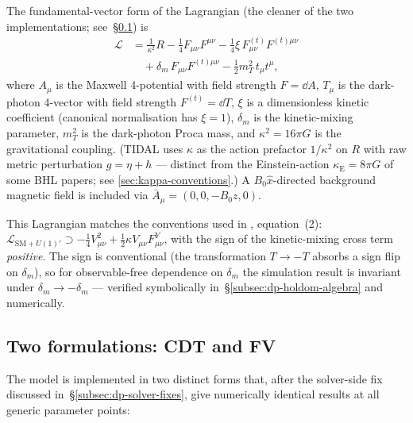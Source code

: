 The fundamental-vector form of the Lagrangian (the cleaner of the two
implementations; see~\S\ref{subsec:dp-cdt-vs-fv}) is
\begin{equation}
  \begin{aligned}
    \mathcal{L}
    &= \frac{1}{\kappa^2} R
      - \tfrac{1}{4} F_{\mu\nu} F^{\mu\nu}
      - \tfrac{1}{4} \xi\, F^{(t)}_{\mu\nu} F^{(t)\mu\nu} \\
    &\quad{}
      + \delta_m\, F_{\mu\nu} F^{(t)\mu\nu}
      - \tfrac{1}{2} m_T^2\, t_\mu t^\mu ,
  \end{aligned}
  \label{eq:dp-lagrangian-fv}
\end{equation}
where $A_\mu$ is the Maxwell 4-potential with field strength
$F = \dd A$, $T_\mu$ is the dark-photon 4-vector with field strength
$F^{(t)} = \dd T$, $\xi$ is a dimensionless kinetic coefficient
(canonical normalisation has $\xi = 1$), $\delta_m$ is the
kinetic-mixing parameter, $m_T^2$ is the dark-photon Proca mass, and
$\kappa^2 = 16\pi G$ is the gravitational coupling. (TIDAL uses $\kappa$ as the action prefactor $1/\kappa^2$ on $R$ with raw metric perturbation $g = \eta + h$ — distinct from the Einstein-action $\kappa_\text{E} = 8\pi G$ of some BHL papers; see \cref{sec:kappa-conventions}.) A
$B_0 \hat{x}$-directed background magnetic field is included via
$\bar{A}_\mu = (0, 0, -B_0 z, 0)$.

This Lagrangian matches the conventions used in
\cite{Pospelov2008SecludedU1}, equation~(2):
$\mathcal{L}_{\mathrm{SM}+U(1)'} \supset -\tfrac{1}{4} V_{\mu\nu}^2 +
\tfrac{1}{2}\kappa V_{\mu\nu} F_{\mu\nu}^Y$, with the sign of the
kinetic-mixing cross term \emph{positive}. The sign is conventional
(the transformation $T \to -T$ absorbs a sign flip on $\delta_m$), so
for observable-free dependence on $\delta_m$ the simulation result is
invariant under $\delta_m \to -\delta_m$ --- verified symbolically
in~\S\ref{subsec:dp-holdom-algebra} and numerically.

\subsection{Two formulations: CDT and FV}
\label{subsec:dp-cdt-vs-fv}

The model is implemented in two distinct forms that, after the
solver-side fix discussed in~\S\ref{subsec:dp-solver-fixes},
give numerically identical results at all generic parameter points:

